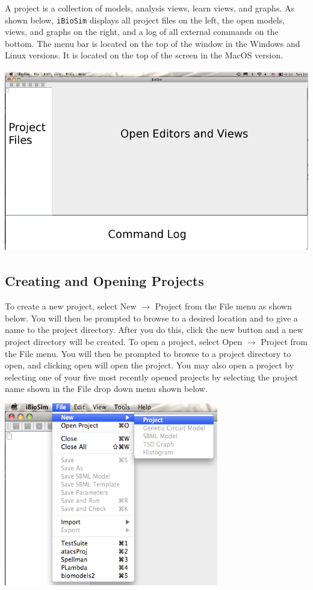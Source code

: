 \documentclass[titlepage,11pt]{article}
\begin{document}
\noindent
A project is a collection of models, analysis views, learn
views, and graphs.  As shown below, {\tt iBioSim} displays all project
files on the left, the open models, views, and graphs on the
right, and a log of all external commands on the bottom.
The menu bar is located on the top of the window in the Windows and
Linux versions.  It is located on the top of the screen in the MacOS version.
\begin{center}
\includegraphics[height=80mm]{screenshots/iBioSim}
\end{center}

\subsection{Creating and Opening Projects}

\noindent
To create a new project, select New $\rightarrow$ Project from the File
menu as shown below. You will then be prompted to browse to a desired location
and to give a name to the project directory. After you do this,
click the new button and a new project directory will be created.
To open a project, select Open $\rightarrow$ Project from the File menu.
You will then be prompted to browse to a project directory to
open, and clicking open will open the project. You may also open
a project by selecting one of your five most recently opened
projects by selecting the project name shown in the File drop
down menu shown below. 
\begin{center}
\includegraphics[height=80mm]{screenshots/project}
\end{center}
\end{document}
